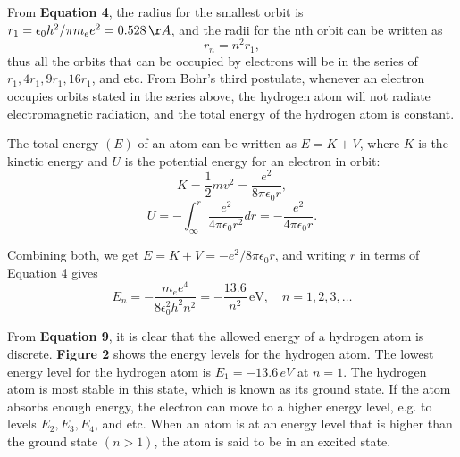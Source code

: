\documentclass[a4paper,11pt]{article}
\begin{document}
From \textbf{Equation 4}, the radius for the smallest orbit is $r_1 = \epsilon_0 h^2 / \pi m_e e^2 = 0.528 \, \AA$, and the radii for the nth orbit can be written as
\begin{equation}
r_n = n^2 r_1,
\end{equation}
thus all the orbits that can be occupied by electrons will be in the series of $r_1, 4r_1, 9r_1, 16r_1$, and etc. From Bohr's third postulate, whenever an electron occupies orbits stated in the series above, the hydrogen atom will not radiate electromagnetic radiation, and the total energy of the hydrogen atom is constant.

The total energy $(E)$ of an atom can be written as $E = K + V$, where $K$ is the kinetic energy and $U$ is the potential energy for an electron in orbit:
\begin{equation}
K = \frac{1}{2} mv^2 = \frac{e^2}{8\pi\epsilon_0 r},
\end{equation}
\begin{equation}
U = - \int_{\infty}^{r} \frac{e^2}{4\pi\epsilon_0 r^2} dr = - \frac{e^2}{4\pi\epsilon_0 r}.
\end{equation}

Combining both, we get $E = K + V = -e^2/8\pi\epsilon_0 r$, and writing $r$ in terms of Equation 4 gives
\begin{equation}
E_n = - \frac{m_e e^4}{8\epsilon_0^2 h^2 n^2} = - \frac{13.6}{n^2} \, \text{eV}, \quad n = 1,2,3, \ldots
\end{equation}

From \textbf{Equation 9}, it is clear that the allowed energy of a hydrogen atom is discrete. \textbf{Figure 2} shows the energy levels for the hydrogen atom. The lowest energy level for the hydrogen atom is $E_1 = -13.6 \, eV$ at $n = 1$. The hydrogen atom is most stable in this state, which is known as its ground state. If the atom absorbs enough energy, the electron can move to a higher energy level, e.g. to levels $E_2, E_3, E_4$, and etc. When an atom is at an energy level that is higher than the ground state $(n > 1)$, the atom is said to be in an excited state.
\end{document}
